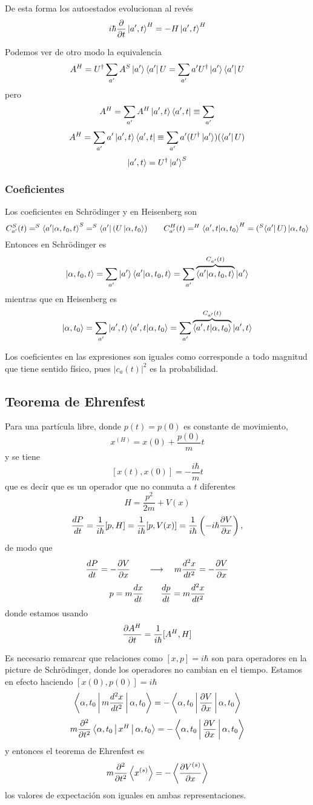 \documentclass[10pt,oneside]{CBFT_book}
\begin{document}
De esta forma los autoestados evolucionan al revés 
\[
	i\hbar \dpar{}{t} \Ket{a',t}^H = -H\Ket{a',t}^H
\]

Podemos ver de otro modo la equivalencia
\[
	A^H = U^\dagger \sum_{a'} A^S \Ket{a'}\Bra{a'}U = 
	\sum_{a'} a'U^\dagger \Ket{a'}\Bra{a'}U
\]
pero 
\[
	A^H = \sum_{a'} A^H \Ket{a',t}\Bra{a',t} \equiv \sum_{a'}
\]
\[
	A^H = \sum_{a'} a' \Ket{a',t}\Bra{a',t} \equiv \sum_{a'} a'(U^\dagger\Ket{a'})(\Bra{a'}U)
\]
\[
	\Ket{a',t} = U^\dagger\Ket{a'}^S
\]

\subsubsection{Coeficientes}

Los coeficientes en Schrödinger y en Heisenberg son 
\[
	C_{a'}^S(t) = ^S\braket{a'|\alpha,t_0,t}^S = ^S\Bra{a'}(U\Ket{\alpha,t_0}) \qquad 
	C_{a'}^H(t) = ^H\braket{a',t|\alpha,t_0}^H = (^S\Bra{a'}U)\Ket{\alpha,t_0}
\]
Entonces en Schrödinger es 
\[
	\Ket{\alpha,t_0,t} = \sum_{a'} \Ket{a'}\braket{a'|\alpha,t_0,t} = 
	\sum_{a'} \overbrace{\braket{a'|\alpha,t_0,t}}^{C_{a'}(t)}\Ket{a'}
\]
mientras que en Heisenberg es 
\[
	\Ket{\alpha,t_0} = \sum_{a'} \Ket{a',t}\braket{a',t|\alpha,t_0} = 
	\sum_{a'} \overbrace{\braket{a',t|\alpha,t_0}}^{C_{a'}(t)}\Ket{a',t}
\]

Los coeficientes en las expresiones son iguales como corresponde a todo magnitud que tiene sentido físico, pues 
$|c_a(t)|^2$ es la probabilidad.

\subsection{Teorema de Ehrenfest}

Para una partícula libre, donde $p(t)=p(0)$ es constante de movimiento,
\[
	x^{(H)} = x(0) + \frac{p(0)}{m}t
\]
y se tiene 
\[
	[x(t),x(0)] = -\frac{i\hbar}{m}t
\]
que es decir que es un operador que no conmuta a $t$ diferentes
\[
	H = \frac{p^2}{2m} + V(x)
\]
\[
	\dtot{P}{t} = \frac{1}{i\hbar}[p,H] = \frac{1}{i\hbar}[p,V(x)] = 
	\frac{1}{i\hbar}\left( -i\hbar\dpar{V}{x}\right),
\]
de modo que 
\[
	\dtot{P}{t} = -\dpar{V}{x} \qquad \longrightarrow \quad m \dtot[2]{x}{t} = -\dpar{V}{x} 
\]
\[
	p = m \dtot{x}{t} \qquad \dtot{p}{t} = m \dtot[2]{x}{t} 
\]
donde estamos usando 
\[
	\dpar{A^H}{t} = \frac{1}{i\hbar}[A^H,H]
\]

Es necesario remarcar que relaciones como $[x,p]=i\hbar$ son para operadores en la picture de Schrödinger, donde los 
operadores no cambian en el tiempo. Estamos en efecto haciendo $[x(0),p(0)]=i\hbar$
\[
	\Braket{\alpha,t_0|m \dtot[2]{x}{t}|\alpha,t_0} = - \Braket{\alpha,t_0|\dpar{V}{x}|\alpha,t_0}
\]
\[
	m\dpar[2]{}{t}\Braket{\alpha,t_0| x^H |\alpha,t_0} = -\Braket{\alpha,t_0|\dpar{V}{x}|\alpha,t_0}
\]
y entonces el teorema de Ehrenfest es 
\[
	m \dpar[2]{}{t} \Braket{x^{(s)}} = - \Braket{ \dpar{V^{(s)}}{x}}
\]
los valores de expectación son iguales en ambas representaciones.







\end{document}
